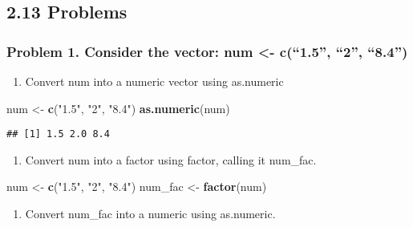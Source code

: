 \documentclass[]{article}
\newenvironment{Shaded}{\begin{snugshade}}{\end{snugshade}}
\newcommand{\KeywordTok}[1]{\textcolor[rgb]{0.13,0.29,0.53}{\textbf{#1}}}
\newcommand{\NormalTok}[1]{#1}
\newcommand{\StringTok}[1]{\textcolor[rgb]{0.31,0.60,0.02}{#1}}
\providecommand{\tightlist}{%
  \setlength{\itemsep}{0pt}\setlength{\parskip}{0pt}}
\begin{document}
\hypertarget{problems}{%
\subsection{2.13 Problems}\label{problems}}

\hypertarget{problem-1.-consider-the-vector-num---c1.5-2-8.4}{%
\subsubsection{Problem 1. Consider the vector: num \textless{}-
c(``1.5'', ``2'',
``8.4'')}\label{problem-1.-consider-the-vector-num---c1.5-2-8.4}}

\begin{enumerate}
\def\labelenumi{\alph{enumi}.}
\tightlist
\item
  Convert num into a numeric vector using as.numeric
\end{enumerate}

\begin{Shaded}
\begin{Highlighting}[]
\NormalTok{num <-}\StringTok{ }\KeywordTok{c}\NormalTok{(}\StringTok{"1.5"}\NormalTok{, }\StringTok{"2"}\NormalTok{, }\StringTok{"8.4"}\NormalTok{)}
\KeywordTok{as.numeric}\NormalTok{(num)}
\end{Highlighting}
\end{Shaded}

\begin{verbatim}
## [1] 1.5 2.0 8.4
\end{verbatim}

\begin{enumerate}
\def\labelenumi{\alph{enumi}.}
\setcounter{enumi}{1}
\tightlist
\item
  Convert num into a factor using factor, calling it num\_fac.
\end{enumerate}

\begin{Shaded}
\begin{Highlighting}[]
\NormalTok{num <-}\StringTok{ }\KeywordTok{c}\NormalTok{(}\StringTok{"1.5"}\NormalTok{, }\StringTok{"2"}\NormalTok{, }\StringTok{"8.4"}\NormalTok{)}
\NormalTok{num_fac <-}\StringTok{ }\KeywordTok{factor}\NormalTok{(num)}
\end{Highlighting}
\end{Shaded}

\begin{enumerate}
\def\labelenumi{\alph{enumi}.}
\setcounter{enumi}{2}
\tightlist
\item
  Convert num\_fac into a numeric using as.numeric.
\end{enumerate}
\end{document}
